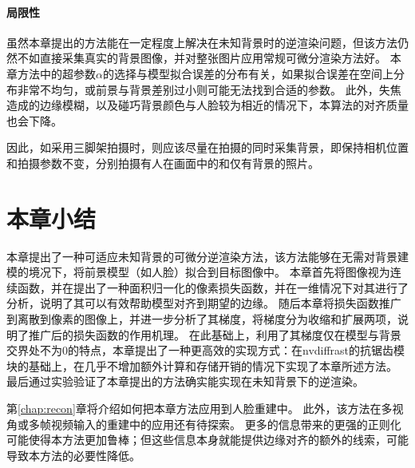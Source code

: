 \paragraph{局限性}

虽然本章提出的方法能在一定程度上解决在未知背景时的逆渲染问题，但该方法仍然不如直接采集真实的背景图像，并对整张图片应用常规可微分渲染方法好。
本章方法中的超参数$\alpha$的选择与模型拟合误差的分布有关，如果拟合误差在空间上分布非常不均匀，或前景与背景差别过小则可能无法找到合适的参数。
此外，失焦造成的边缘模糊，以及碰巧背景颜色与人脸较为相近的情况下，本算法的对齐质量也会下降。

因此，如采用三脚架拍摄时，则应该尽量在拍摄的同时采集背景，即保持相机位置和拍摄参数不变，分别拍摄有人在画面中的和仅有背景的照片。

\section*{本章小结}

本章提出了一种可适应未知背景的可微分逆渲染方法，该方法能够在无需对背景建模的境况下，将前景模型（如人脸）拟合到目标图像中。
本章首先将图像视为连续函数，并在提出了一种面积归一化的像素损失函数，并在一维情况下对其进行了分析，说明了其可以有效帮助模型对齐到期望的边缘。
随后本章将损失函数推广到离散到像素的图像上，并进一步分析了其梯度，将梯度分为收缩和扩展两项，说明了推广后的损失函数的作用机理。
在此基础上，利用了其梯度仅在模型与背景交界处不为0的特点，本章提出了一种更高效的实现方式：在nvdiffrast的抗锯齿模块的基础上，在几乎不增加额外计算和存储开销的情况下实现了本章所述方法。
最后通过实验验证了本章提出的方法确实能实现在未知背景下的逆渲染。

第\ref{chap:recon}章将介绍如何把本章方法应用到人脸重建中。
此外，该方法在多视角或多帧视频输入的重建中的应用还有待探索。
更多的信息带来的更强的正则化可能使得本方法更加鲁棒；但这些信息本身就能提供边缘对齐的额外的线索，可能导致本方法的必要性降低。
